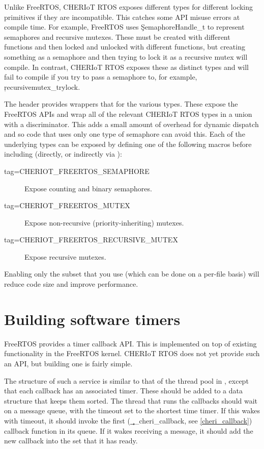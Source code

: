 Unlike FreeRTOS, CHERIoT RTOS exposes different types for different locking primitives if they are incompatible.
This catches some API misuse errors at compile time.
For example, FreeRTOS uses \c{SemaphoreHandle_t} to represent semaphores and recursive mutexes.
These must be created with different functions and then locked and unlocked with different functions, but creating something as a semaphore and then trying to lock it as a recursive mutex will compile.
In contrast, CHERIoT RTOS exposes these as distinct types and will fail to compile if you try to pass a semaphore to, for example, \c{recursivemutex_trylock}.

The  header provides wrappers that for the various types.
These expose the FreeRTOS APIs and wrap all of the relevant CHERIoT RTOS types in a union with a discriminator.
This adds a small amount of overhead for dynamic dispatch and so code that uses only one type of semaphore can avoid this.
Each of the underlying types can be exposed by defining one of the following macros before including  (directly, or indirectly via ):

\begin{description}
	\item[tag=CHERIOT_FREERTOS_SEMAPHORE]{ Expose counting and binary semaphores.}
	\item[tag=CHERIOT_FREERTOS_MUTEX]{ Expose non-recursive (priority-inheriting) mutexes.}
	\item[tag=CHERIOT_FREERTOS_RECURSIVE_MUTEX]{ Expose recursive mutexes.}
\end{description}

Enabling only the subset that you use (which can be done on a per-file basis) will reduce code size and improve performance.

\section{Building software timers}

FreeRTOS provides a timer callback API.
This is implemented on top of existing functionality in the FreeRTOS kernel.
CHERIoT RTOS does not yet provide such an API, but building one is fairly simple.

The structure of such a service is similar to that of the thread pool in , except that each callback has an associated timer.
These should be added to a data structure that keeps them sorted.
The thread that runs the callbacks should wait on a message queue, with the timeout set to the shortest time timer.
If this wakes with timeout, it should invoke the first (\c{__cheri_callback}, see \ref{cheri_callback}) callback function in its queue.
If it wakes receiving a message, it should add the new callback into the set that it has ready.

